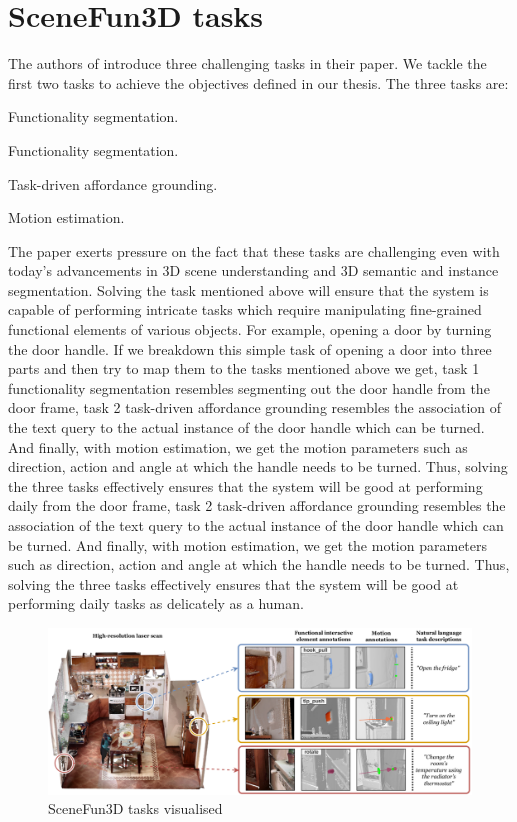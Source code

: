 \section{SceneFun3D tasks}
The authors of \cite{delitzas2024scenefun3d} introduce three challenging tasks in their paper. We tackle the first two tasks to achieve the 
objectives defined in our thesis. The three tasks are:
\begin{compactenum}[1.]
\item	Functionality segmentation.
\item	Functionality segmentation.
\item	Task-driven affordance grounding.
\item	Motion estimation.
\end{compactenum}
The paper exerts pressure on the fact that these tasks are challenging even with today's advancements in 3D scene understanding
and 3D semantic and instance segmentation. Solving the task mentioned above will ensure that the system is capable of 
performing intricate tasks which require manipulating fine-grained functional elements of various objects.
For example, opening a door by turning the door handle. If we breakdown this simple task of opening a door into three parts
and then try to map them to the tasks mentioned above we get, task 1 functionality segmentation resembles segmenting out the door handle 
from the door frame, task 2 task-driven affordance grounding resembles the association of the text query to the actual 
instance of the door handle which can be turned. And finally, with motion estimation, we get the motion parameters such as direction, action and angle 
at which the handle needs to be turned. Thus, solving the three tasks effectively ensures that the system will be good at performing daily
from the door frame, task 2 task-driven affordance grounding resembles the association of the text query to the actual 
instance of the door handle which can be turned. And finally, with motion estimation, we get the motion parameters such as direction, action and angle 
at which the handle needs to be turned. Thus, solving the three tasks effectively ensures that the system will be good at performing daily
tasks as delicately as a human. \\
\begin{figure}[ht!]
    \centering
    \includegraphics[width=\textwidth]{content/images/SceneFun3D.png}
    \caption{SceneFun3D tasks visualised \cite{delitzas2024scenefun3d}}
    \label{fig:your_image_label}
\end{figure}
